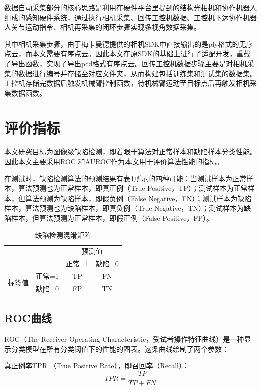 数据自动采集部分的核心思路是利用在硬件平台里提到的结构光相机和协作机器人组成的感知硬件系统，通过执行相机采集、回传工控机数据、工控机下达协作机器人关节运动指令、相机再采集的闭环步骤实现多视角数据采集。

其中相机采集步骤，由于梅卡曼德提供的相机SDK中直接输出的是ply格式的无序点云，而本文需要有序点云。因此本文在原SDK的基础上进行了适配开发，重载了导出函数，实现了导出pcd格式有序点云。回传工控机数据步骤主要是对相机采集的数据进行编号并存储至对应文件夹，从而构建包括训练集和测试集的数据集。工控机存储完数据后触发机械臂控制函数，待机械臂运动至目标点后再触发相机采集数据函数。


\section{评价指标}
本文研究目标为图像级缺陷检测，即着眼于算法对正常样本和缺陷样本分类性能。因此本文主要采用ROC
和AUROC作为本文用于评价算法性能的指标。

在测试时，缺陷检测算法的预测结果有表\ref{tab:matrix}所示的四种可能：当测试样本为正常样本，算法预测也为正常样本，即真正例（True Positive，TP）；测试样本为正常样本，但算法预测为缺陷样本，即假负例（False Negative，FN）；测试样本为缺陷样本，算法预测也为缺陷样本，即真负例（True Negative，TN）；测试样本为缺陷样本，但算法预测为正常样本，即假正例（False Positive，FP）。

\begin{table}[htbp]
  \centering
  \caption{缺陷检测混淆矩阵}\label{tab:matrix}
  \begin{tabular}{@{}cccc@{}} \toprule
       &         & \multicolumn{2}{c}{预测值} \\ \cmidrule(r){3-4}
         &        & 正常=1 & 缺陷=0 \\ \midrule
  \multirow{2}{*}{标签值}	& 正常=1 & TP & FN \\
            & 缺陷=0 & FP & TN \\ \bottomrule
   \end{tabular}
  \end{table}

\subsection{ROC曲线}

ROC（The Receiver Operating Characteristic，受试者操作特征曲线）是一种显示分类模型在所有分类阈值下的性能的图表。这条曲线绘制了两个参数：

真正例率TPR （True Positive Rate），即召回率（Recall）：
\begin{equation}
  T P R=\frac{T P}{T P+F N}
\end{equation}

